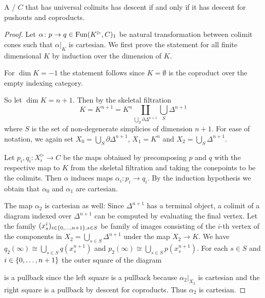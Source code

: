 \begin{lemma}\label{lem:descentIffDescentPoAndCoprod}
    A \inftycat/ $C$ that has universal colimits has descent if and only if it has descent for pushouts and coproducts.
    \begin{proof} %
        Let $\alpha\colon p\to q\in\operatorname{Fun}(K^{\rhd},C)_1$ be natural transformation between colimit cones such that $\alpha|_K$ is cartesian.
        We first prove the statement for all finite dimensional $K$ by induction over the dimension of $K$. %

        For $\dim K=-1$ the statement follows since $K=\emptyset$ is the coproduct over the empty indexing category.

        So let $\dim K=n+1$.
        Then by the skeletal filtration        
        \begin{equation*}
            K=K^{n+1}=K^n\coprod\limits_{\bigcup\limits_S \partial\Delta^{n+1}}\bigcup_S \Delta^{n+1}
        \end{equation*}
        where $S$ is the set of non-degenerate simplicies of dimension $n+1$.
        For ease of notation, we again set $X_{0}=\bigcup\limits_S \partial\Delta^{n+1}$, $X_1=K^n$ and $X_2=\bigcup\limits_S \Delta^{n+1}$.
        
        Let $p_i,q_i\colon X_i^{\rhd}\to C$ be the maps obtained by precomposing $p$ and $q$ with the respective map to $K$ from the skeletal filtration and taking the conepoints to be the colimits.
        Then $\alpha$ induces maps $\alpha_i\colon p_i\to q_i$. %
        By the induction hypothesis we obtain that $\alpha_0$ and $\alpha_1$ are cartesian.

        The map $\alpha_2$ is cartesian as well: 
        Since $\Delta^{n+1}$ has a terminal object, a colimit of a diagram indexed over $\Delta^{n+1}$ can be computed by evaluating the final vertex. 
        Let the family $(x_s^i)_{i\in\left\lbrace0,\ldots,n+1\right\rbrace,s\in S}$ be family of images consisting of the $i$-th vertex of the components in $X_2=\bigcup\limits_{s\in S} \Delta^{n+1}$ under the map $X_2\to K$.
        We have $q_2(\infty)\cong\bigcup\limits_{s\in S} q(x_s^{n+1})$ and $p_2(\infty)\cong\bigcup\limits_{s\in S} p(x_s^{n+1})$.
        For each $s\in S$ and $i\in\left\lbrace0,\ldots,n+1\right\rbrace$ the outer square of the diagram
        \begin{center}
        \end{center}
        is a pullback since the left square is a pullback because $\alpha_2|_{X_2}$ is cartesian and the right square is a pullback by descent for coproducts.
        Thus $\alpha_2$ is cartesian.


\end{proof}
\end{lemma}
